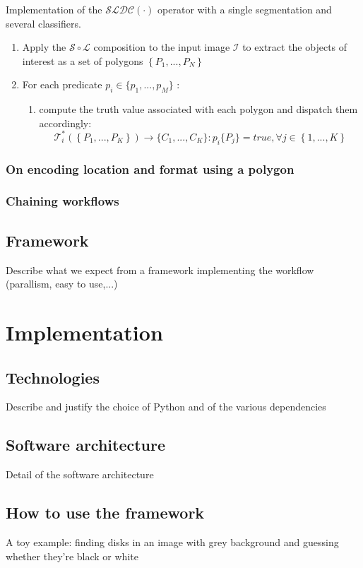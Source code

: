 \begin{algorithm}\label{algo:single_seg_several_classif}
Implementation of the $\mathcal{SLDC}(\cdot)$ operator with a single segmentation and several classifiers. 

\begin{enumerate}
	\item Apply the $\mathcal{S} \circ \mathcal{L}$ composition to the input image $\mathcal{I}$ to extract the objects of interest as a set of polygons $\left\{P_1, ..., P_N \right\}$ 
	\item For each predicate $p_i \in \{p_1, ..., p_M\}$ :
	\begin{enumerate}
		\item compute the truth value associated with each polygon and dispatch them accordingly: 
		\[
			\mathcal{T}^*_i\left(\left\{P_1, ..., P_K\right\}\right) \rightarrow \{C_1, ..., C_K\}: p_i\{P_j\} = true, \forall j \in \left\{1, ..., K\right\}
		\]
	\end{enumerate} 
\end{enumerate}
\end{algorithm}

\subsubsection{On encoding location and format using a polygon}
\label{sssec:choice_polygon}

\subsubsection{Chaining workflows}

\subsection{Framework}

Describe what we expect from a framework implementing the workflow (parallism, easy to use,...) 


\section{Implementation}
\subsection{Technologies}
Describe and justify the choice of Python and of the various dependencies
\subsection{Software architecture}
Detail of the software architecture
\subsection{How to use the framework}
A toy example: finding disks in an image with grey background and guessing whether they're black or white 